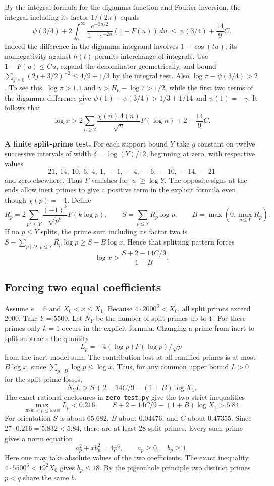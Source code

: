 By the integral formula for the digamma function and Fourier inversion,
the integral including its factor $1/(2\pi)$ equals
\[
 \psi(3/4)+
 2\int_0^\infty \frac{e^{-3u/2}}{1-e^{-2u}}(1-F(u))\,du
 \ \le\ \psi(3/4)+\frac{14}9 C .
\]
Indeed the difference in the digamma integrand involves $1-\cos(tu)$;
its nonnegativity against $h(t)$ permits interchange of integrals.
Use $1-F(u)\le C u$, expand the denominator geometrically, and bound
$\sum_{j\ge0}(2j+3/2)^{-2}\le4/9+1/3$ by the integral test.
Also $\log\pi-\psi(3/4)>2$. To see this, $\log\pi>1.1$ and
$\gamma>H_6-\log 7>1/2$, while the first two terms of the digamma
difference give $\psi(1)-\psi(3/4)>1/3+1/14$ and $\psi(1)=-\gamma$.
It follows that
\[
 \log x> 2\sum_{n\ge2}\frac{\chi(n)\Lambda(n)}{\sqrt n}
                    F(\log n)+2-\frac{14}9 C.
\]

\medskip\noindent\textbf{A finite split-prime test.}
For each support bound $Y$ take $g$ constant on twelve successive intervals of width
$\delta=\log(Y)/12$, beginning at zero, with respective values
\[
          21,\ 14,\ 10,\ 6,\ 4,\ 1,\ -1,\ -4,\ -6,\ -10,\ -14,\ -21
\]
and zero elsewhere. Thus $F$ vanishes for $|u|\ge\log Y$. The opposite
signs at the ends allow inert primes to give a positive term in the
explicit formula even though $\chi(p)=-1$. Define
\[
 R_p=2\sum_{p^k\le Y}\frac{(-1)^k}{\sqrt{p^k}}F(k\log p),\qquad
 S=\sum_{p\le Y}R_p\log p,\qquad B=\max(0,\max_{p\le Y}R_p).
\]
If no $p\le Y$ splits, the prime sum including its factor two is
$S-\sum_{p\mid D,\,p\le Y}R_p\log p\ge S-B\log x$.
Hence that splitting pattern forces
\[
                 \log x>\frac{S+2-14C/9}{1+B}.
\]

\subsection{Forcing two equal coefficients}
Assume $e=6$ and $X_0<x\le X_1$. Because $4\cdot2000^6<X_0$, all split primes exceed 2000. Take $Y=5500$. Let $N_Y$ be the number of split primes up to $Y$. For these primes only $k=1$ occurs in the explicit formula. Changing a prime from inert to split subtracts the quantity
\[
   L_p=-4(\log p) F(\log p)/\sqrt p
\]
from the inert-model sum. The contribution lost at all ramified primes is at most $B\log x$, since $\sum_{p\mid D}\log p\le\log x$. Thus, for any common upper bound $L>0$ for the split-prime losses,
\[
 N_Y L > S+2-14C/9-(1+B)\log X_1.
\]
The exact rational enclosures in \texttt{zero\_test.py} give the two strict inequalities
\[
 \max_{2000<p\le5500} L_p<0.216,\qquad
 S+2-14C/9-(1+B)\log X_1>5.84.
\]
For orientation $S$ is about $65.682$, $B$ about $0.04476$, and $C$ about $0.47355$. Since $27\cdot0.216=5.832<5.84$, there are at least 28 split primes. Every such prime gives a norm equation
\[
       a_p^2+x b_p^2=4p^6,\qquad a_p\ge0,\quad b_p\ge1 .
\]
Here one may take absolute values of the two coefficients. The exact inequality $4\cdot5500^6<19^2 X_0$ gives $b_p\le18$. By the pigeonhole principle two distinct primes $p<q$ share the same $b$.

